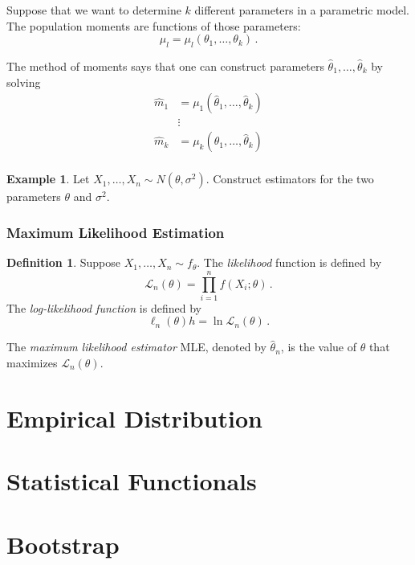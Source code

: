 \documentclass[
  openany]{book}
\theoremstyle{definition}
\newtheorem{definition}{Definition}[chapter]
\theoremstyle{definition}
\newtheorem{example}{Example}[chapter]
\theoremstyle{definition}
\theoremstyle{definition}
\theoremstyle{remark}
\begin{document}
Suppose that we want to determine \(k\) different parameters in a parametric model.
The population moments are functions of those parameters:
\[
 \mu_l = \mu_l (\theta_1, \dots, \theta_k) \,.
\]

The method of moments says that one can construct parameters \(\hat \theta_1, \dots, \hat \theta_k\) by solving
\[
\begin{aligned}
    \hat m_1 &= \mu_1 (\hat \theta_1, \dots, \hat \theta_k) \\
    &\vdots\\
    \hat m_k &= \mu_k (\hat \theta_1, \dots, \hat \theta_k) \\
\end{aligned}
\]

\begin{example}
Let \(X_1, \dots, X_n \sim N(\theta, \sigma^2)\).
Construct estimators for the two parameters \(\theta\) and \(\sigma^2\).
\end{example}

\subsubsection{Maximum Likelihood Estimation}\label{maximum-likelihood-estimation}

\begin{definition}
Suppose \(X_1, \dots, X_n \sim f_\theta\).
The \emph{likelihood} function is defined by
\[ \mathcal{L}_n(\theta) = \prod_{i = 1}^n f (X_i; \theta) \,. \]
The \emph{log-likelihood function} is defined by
\[ \ell_n (\theta) h = \ln \mathcal{L}_n (\theta) \,. \]

The \emph{maximum likelihood estimator} MLE, denoted by \(\hat \theta_n\), is the value of
\(\theta\) that maximizes \(\mathcal{L}_n(\theta)\).
\end{definition}

\section{Empirical Distribution}\label{empirical-distribution}

\section{Statistical Functionals}\label{statistical-functionals}

\section{Bootstrap}\label{bootstrap}
\end{document}
